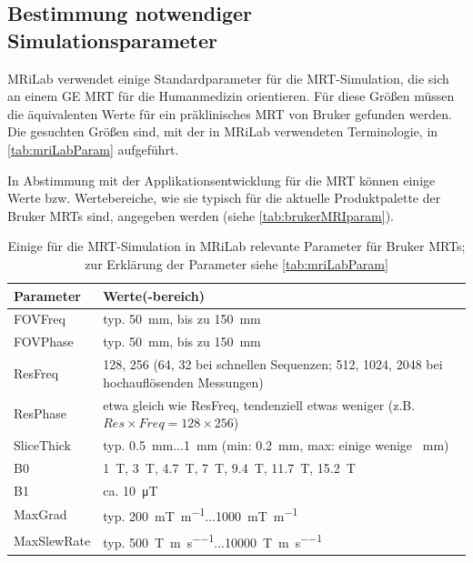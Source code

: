 \subsection{Bestimmung notwendiger Simulationsparameter}
MRiLab verwendet einige Standardparameter für die MRT-Simulation, die sich an einem GE MRT für die Humanmedizin orientieren. Für diese Größen müssen die äquivalenten Werte für ein präklinisches MRT von Bruker gefunden werden. Die gesuchten Größen sind, mit der in MRiLab verwendeten Terminologie, in \autoref{tab:mriLabParam} aufgeführt.

In Abstimmung mit der Applikationsentwicklung für die MRT können einige Werte bzw. Wertebereiche, wie sie typisch für die aktuelle Produktpalette der Bruker MRTs sind, angegeben werden (siehe \autoref{tab:brukerMRIparam}). 

\begin{table}[H]
	\centering
	\caption[Simulationsparameter für Bruker MRTs]{Einige für die MRT-Simulation in MRiLab relevante Parameter für Bruker MRTs; zur Erklärung der Parameter siehe \autoref{tab:mriLabParam}}
	\label{tab:brukerMRIparam}
	\begin{tabularx}{\textwidth}{lX}
		\toprule
		\textbf{Parameter} & \textbf{Werte(-bereich)}\\
		\midrule
		FOVFreq    & typ. \SI{50}{\mm}, bis zu \SI{150}{\mm}\\
		FOVPhase   & typ. \SI{50}{\mm}, bis zu \SI{150}{\mm}\\
		ResFreq    & 128, 256 (64, 32 bei schnellen Sequenzen; 512, 1024, 2048 bei hochauflösenden Messungen)\\
		ResPhase   & etwa gleich wie ResFreq, tendenziell etwas weniger (z.B. $Res \times Freq=128\times256$)\\
		SliceThick & typ. \SI{0.5}{\mm}...\SI{1}{\mm} (min: \SI{0.2}{\mm}, max: einige wenige \SI{}{\mm})\\
		B0         & \SI{1}{\tesla}, \SI{3}{\tesla}, \SI{4.7}{\tesla}, \SI{7}{\tesla}, \SI{9.4}{\tesla}, \SI{11.7}{\tesla}, \SI{15.2}{\tesla} \\
		B1         & ca. \SI{10}{\micro\tesla}\\
		MaxGrad    & typ. \SI{200}{\milli\tesla\per\m}...\SI{1000}{\milli\tesla\per\m}\\
		MaxSlewRate& typ. \SI{500}{\tesla\per\m\per\s}...\SI{10000}{\tesla\per\m\per\s}\\
		\bottomrule
	\end{tabularx}
\end{table}

